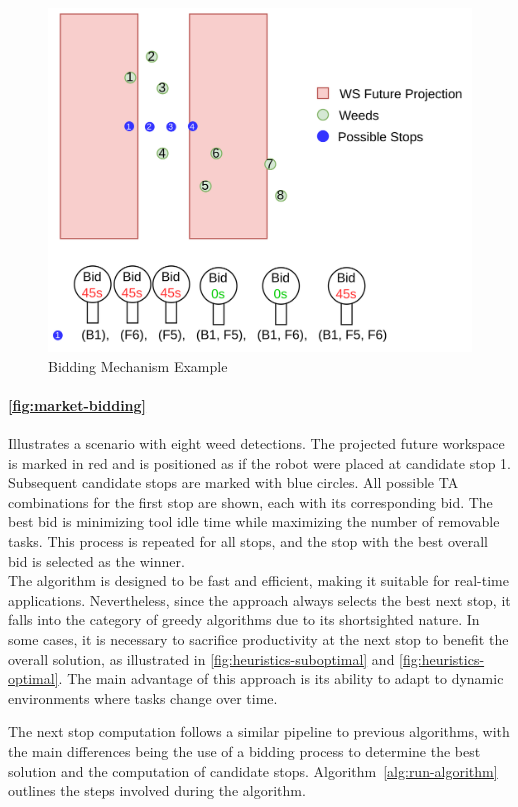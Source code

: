 \begin{figure}[hbt]
    \centering
    \includegraphics[width=0.7\linewidth]{gfx/ch02/mkt_bidding.png}
    \caption{Bidding Mechanism Example}
    \label{fig:market-bidding}
\end{figure}

\paragraph{\autoref{fig:market-bidding}} Illustrates a scenario with eight weed detections. The projected future workspace is marked in red and is positioned as if the robot were placed at candidate stop 1. Subsequent candidate stops are marked with blue circles. All possible \ac{TA} combinations for the first stop are shown, each with its corresponding bid. The best bid is minimizing tool idle time while maximizing the number of removable tasks. This process is repeated for all stops, and the stop with the best overall bid is selected as the winner. \\

The algorithm is designed to be fast and efficient, making it suitable for real-time applications. Nevertheless, since the approach always selects the best next stop, it falls into the category of greedy algorithms due to its shortsighted nature. In some cases, it is necessary to sacrifice productivity at the next stop to benefit the overall solution, as illustrated in \autoref{fig:heuristics-suboptimal} and \autoref{fig:heuristics-optimal}. The main advantage of this approach is its ability to adapt to dynamic environments where tasks change over time.

The next stop computation follows a similar pipeline to previous algorithms, with the main differences being the use of a bidding process to determine the best solution and the computation of candidate stops. Algorithm~\ref{alg:run-algorithm} outlines the steps involved during the algorithm.

